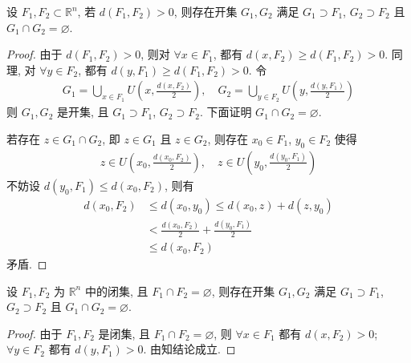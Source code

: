 \documentclass[../../main.tex]{subfiles}
\begin{document}
\begin{theorem}\label{theorem:距离大于零的两个集合中一定存在两个无交的子集}
设 $F_1, F_2 \subset \mathbb{R}^n$, 若 $d(F_1, F_2) > 0$, 则存在开集 $G_1, G_2$ 满足 $G_1 \supset F_1$, $G_2 \supset F_2$ 且 $G_1 \cap G_2 = \varnothing$.
\end{theorem}
\begin{proof}
由于 $d(F_1, F_2) > 0$, 则对 $\forall x \in F_1$, 都有 $d(x, F_2) \geqslant d(F_1, F_2) > 0$. 同理, 对 $\forall y \in F_2$, 都有 $d(y, F_1) \geqslant d(F_1, F_2) > 0$. 令
\begin{align*}
G_1 = \bigcup_{x \in F_1} U\left(x, \frac{d(x, F_2)}{2}\right), \quad G_2 = \bigcup_{y \in F_2} U\left(y, \frac{d(y, F_1)}{2}\right)
\end{align*}
则 $G_1, G_2$ 是开集, 且 $G_1 \supset F_1$, $G_2 \supset F_2$. 下面证明 $G_1 \cap G_2 = \varnothing$.

若存在 $z \in G_1 \cap G_2$, 即 $z \in G_1$ 且 $z \in G_2$, 则存在 $x_0 \in F_1$, $y_0 \in F_2$ 使得
\begin{align*}
z \in U\left(x_0, \frac{d(x_0, F_2)}{2}\right), \quad z \in U\left(y_0, \frac{d(y_0, F_1)}{2}\right)
\end{align*}
不妨设 $d(y_0, F_1) \leqslant d(x_0, F_2)$, 则有
\begin{align*}
d(x_0, F_2) &\leqslant d(x_0, y_0) \leqslant d(x_0, z) + d(z, y_0)\\
&< \frac{d(x_0, F_2)}{2} + \frac{d(y_0, F_1)}{2}\\
&\leqslant d(x_0, F_2)
\end{align*}
矛盾.
\end{proof}

\begin{theorem}[分离定理]\label{theorem:分离定理}
设 $F_1, F_2$ 为 $\mathbb{R}^n$ 中的闭集, 且 $F_1 \cap F_2 = \varnothing$, 则存在开集 $G_1, G_2$ 满足 $G_1 \supset F_1$, $G_2 \supset F_2$ 且 $G_1 \cap G_2 = \varnothing$.
\end{theorem}
\begin{proof}
由于 $F_1, F_2$ 是闭集, 且 $F_1 \cap F_2 = \varnothing$, 则 $\forall x \in F_1$ 都有 $d(x, F_2) > 0$; $\forall y \in F_2$ 都有 $d(y, F_1) > 0$. 由知结论成立.
\end{proof}
\end{document}

